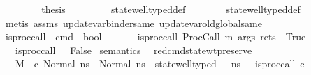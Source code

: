 \begin{isabellebody}
\ \ \ \ \ \isamarkupfalse%
\ \isamarkupfalse%
\ {\isacharquery}{\kern0pt}thesis\ \isanewline
\ \ \ \ \ \ \isamarkupfalse%
\ state{\isacharunderscore}{\kern0pt}well{\isacharunderscore}{\kern0pt}typed{\isacharunderscore}{\kern0pt}def\isanewline
\ \ \ \ \ \ \isamarkupfalse%
\ state{\isacharunderscore}{\kern0pt}well{\isacharunderscore}{\kern0pt}typed{\isacharunderscore}{\kern0pt}def\isanewline
\ \ \ \ \ \ \isamarkupfalse%
\ {\isacharparenleft}{\kern0pt}metis\ assms{\isacharparenleft}{\kern0pt}{}{\isacharparenright}{\kern0pt}\ update{\isacharunderscore}{\kern0pt}var{\isacharunderscore}{\kern0pt}binder{\isacharunderscore}{\kern0pt}same\ update{\isacharunderscore}{\kern0pt}var{\isacharunderscore}{\kern0pt}old{\isacharunderscore}{\kern0pt}global{\isacharunderscore}{\kern0pt}same{\isacharparenright}{\kern0pt}\isanewline
\ \ \isamarkupfalse%
%
\endisatagproof
{\isafoldproof}%
%
\isadelimproof
\ \ \ \ \isanewline
%
\endisadelimproof
\isanewline
{}\isamarkupfalse%
\ is{\isacharunderscore}{\kern0pt}proc{\isacharunderscore}{\kern0pt}call\ {\isacharcolon}{\kern0pt}{\isacharcolon}{\kern0pt}\ {\isachardoublequoteopen}cmd\ {\isasymRightarrow}\ bool{\isachardoublequoteclose}\isanewline
\ \ \isanewline
\ \ \ \ {\isachardoublequoteopen}is{\isacharunderscore}{\kern0pt}proc{\isacharunderscore}{\kern0pt}call\ {\isacharparenleft}{\kern0pt}ProcCall\ m\ args\ rets{\isacharparenright}{\kern0pt}\ {\isacharequal}{\kern0pt}\ True{\isachardoublequoteclose}\isanewline
\ \ {\isacharbar}{\kern0pt}\ {\isachardoublequoteopen}is{\isacharunderscore}{\kern0pt}proc{\isacharunderscore}{\kern0pt}call\ {\isacharunderscore}{\kern0pt}\ {\isacharequal}{\kern0pt}\ False{\isachardoublequoteclose}\isanewline
\isanewline
\isanewline
{}\isamarkupfalse%
\ semantics\ \isanewline
\isanewline
{}\isamarkupfalse%
\ red{\isacharunderscore}{\kern0pt}cmd{\isacharunderscore}{\kern0pt}state{\isacharunderscore}{\kern0pt}wt{\isacharunderscore}{\kern0pt}preserve{\isacharcolon}{\kern0pt}\isanewline
\ \ \ {\isachardoublequoteopen}M{\isacharcomma}{\kern0pt}{\isasymLambda}{\isacharcomma}{\kern0pt}{\isasymGamma}{\isacharcomma}{\kern0pt}{\isasymOmega}\ {\isasymturnstile}\ {\isasymlangle}c{\isacharcomma}{\kern0pt}\ Normal\ ns{\isasymrangle}\ {\isasymrightarrow}\ Normal\ ns{\isacharprime}{\kern0pt}{\isachardoublequoteclose}\ \ {\isachardoublequoteopen}state{\isacharunderscore}{\kern0pt}well{\isacharunderscore}{\kern0pt}typed\ {\isasymLambda}\ {\isasymOmega}\ ns{\isachardoublequoteclose}\ \ {\isachardoublequoteopen}{\isasymnot}\ {\isacharparenleft}{\kern0pt}is{\isacharunderscore}{\kern0pt}proc{\isacharunderscore}{\kern0pt}call\ c{\isacharparenright}{\kern0pt}{\isachardoublequoteclose}\isanewline

\end{isabellebody}

